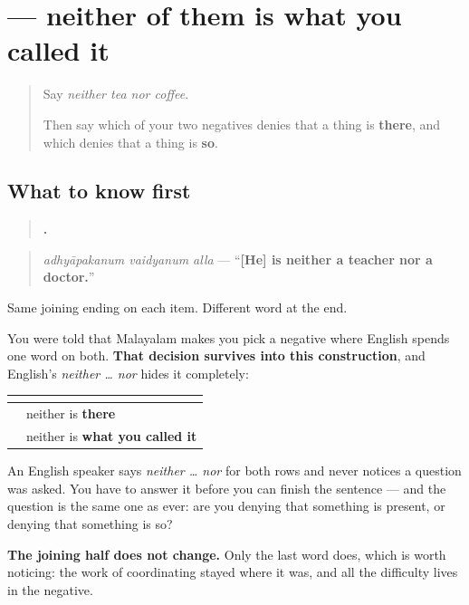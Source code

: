 \section[\texorpdfstring{\ml{അധ്യാപകനും} \ml{വൈദ്യനും} … (adhyaapakanum …)}{അധ്യാപകനും വൈദ്യനും … (adhyaapakanum …)}]{   — neither of them is what you called it}

\label{lesson:ML-C109-neither-so}



\begin{quote}
Say \emph{neither tea nor coffee}.

Then say which of your two negatives denies that a thing is \textbf{there}, and which denies that a thing is \textbf{so}.
\end{quote}

\subsection*{What to know first}
\begin{quote}
\textbf{  .}
\end{quote}

\begin{quote}
\emph{adhyāpakanum vaidyanum alla} — \textquotedblleft{}\textbf{{[}He{]} is neither a teacher nor a doctor.}\textquotedblright{}
\end{quote}

Same joining ending on each item. Different word at the end.

\begin{grammarlens}[title={Grammar Lens: the choice you learned does not go away}]
You were told that Malayalam makes you pick a negative where English spends one word on both. \textbf{That decision survives into this construction}, and English's \emph{neither … nor} hides it completely:

\noindent
\begin{tabularx}{\linewidth}{@{}>{\raggedright\arraybackslash}X>{\raggedright\arraybackslash}X@{}}
\toprule
\textbf{} & \textbf{} \\
\midrule
\textbf{\ml{ചായയും} \ml{കാപ്പിയും} \ml{ഇല്ല}} & neither is \textbf{there} \\
\textbf{\ml{അധ്യാപകനും} \ml{വൈദ്യനും} \ml{അല്ല}} & neither is \textbf{what you called it} \\
\bottomrule
\end{tabularx}

An English speaker says \emph{neither … nor} for both rows and never notices a question was asked. You have to answer it before you can finish the sentence — and the question is the same one as ever: are you denying that something is present, or denying that something is so?

\textbf{The joining half does not change.} Only the last word does, which is worth noticing: the work of coordinating stayed where it was, and all the difficulty lives in the negative.
\end{grammarlens}

